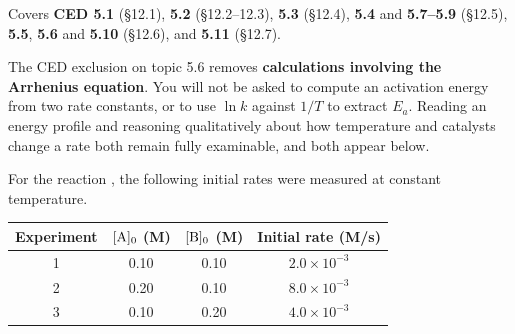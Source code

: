 \documentclass{apchem-exam}
\begin{document}
\apctitleblock

\begin{apcnote}
Covers \textbf{CED 5.1} (\S12.1), \textbf{5.2} (\S12.2--12.3),
\textbf{5.3} (\S12.4), \textbf{5.4} and \textbf{5.7--5.9} (\S12.5),
\textbf{5.5}, \textbf{5.6} and \textbf{5.10} (\S12.6), and \textbf{5.11}
(\S12.7).

The CED exclusion on topic 5.6 removes \textbf{calculations involving the
Arrhenius equation}. You will not be asked to compute an activation energy
from two rate constants, or to use $\ln k$ against $1/T$ to extract
$E_a$. Reading an energy profile and reasoning qualitatively about how
temperature and catalysts change a rate both remain fully examinable, and
both appear below.
\end{apcnote}



For the reaction , the following initial rates were
measured at constant temperature.

\begin{center}
\begin{tabular}{cccc}
\hline
\textbf{Experiment} & $[\ce{A}]_0$ (M) & $[\ce{B}]_0$ (M) &
\textbf{Initial rate} (M/s) \\
\hline
1 & 0.10 & 0.10 & $2.0\times10^{-3}$ \\
2 & 0.20 & 0.10 & $8.0\times10^{-3}$ \\
3 & 0.10 & 0.20 & $4.0\times10^{-3}$ \\
\hline
\end{tabular}
\end{center}
\end{document}
